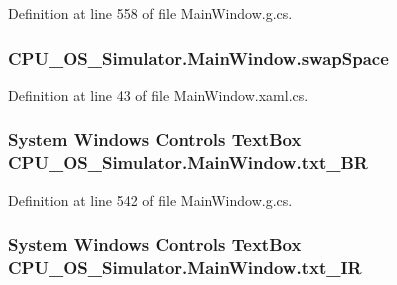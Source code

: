 Definition at line 558 of file Main\+Window.\+g.\+cs.

\hypertarget{class_c_p_u___o_s___simulator_1_1_main_window_ab9638abdc8d65670240a036bc02d813c}{}
\subsubsection[{swap\+Space}]{ C\+P\+U\+\_\+\+O\+S\+\_\+\+Simulator.\+Main\+Window.\+swap\+Space\hspace{0.3cm}{\ttfamily [private]}}\label{class_c_p_u___o_s___simulator_1_1_main_window_ab9638abdc8d65670240a036bc02d813c}


Definition at line 43 of file Main\+Window.\+xaml.\+cs.

\hypertarget{class_c_p_u___o_s___simulator_1_1_main_window_a7a878022ed4cb948598d3685dc821a00}{}
\subsubsection[{txt\+\_\+\+B\+R}]{\setlength{\rightskip}{0pt plus 5cm}System Windows Controls Text\+Box C\+P\+U\+\_\+\+O\+S\+\_\+\+Simulator.\+Main\+Window.\+txt\+\_\+\+B\+R\hspace{0.3cm}{\ttfamily [package]}}\label{class_c_p_u___o_s___simulator_1_1_main_window_a7a878022ed4cb948598d3685dc821a00}


Definition at line 542 of file Main\+Window.\+g.\+cs.

\hypertarget{class_c_p_u___o_s___simulator_1_1_main_window_ac6e0cfcdd72688d7bffd100ce6d11a28}{}
\subsubsection[{txt\+\_\+\+I\+R}]{\setlength{\rightskip}{0pt plus 5cm}System Windows Controls Text\+Box C\+P\+U\+\_\+\+O\+S\+\_\+\+Simulator.\+Main\+Window.\+txt\+\_\+\+I\+R\hspace{0.3cm}{\ttfamily [package]}}\label{class_c_p_u___o_s___simulator_1_1_main_window_ac6e0cfcdd72688d7bffd100ce6d11a28}


